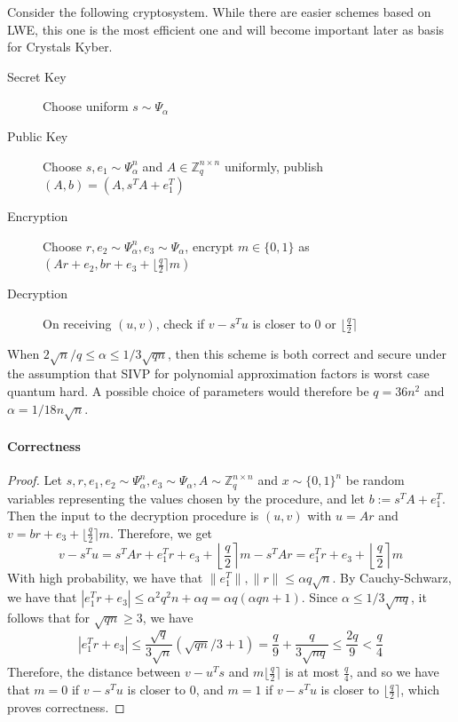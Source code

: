 \documentclass{report}
\newcommand{\Z}{\mathbb{Z}}
\begin{document}


\remark[A cryptosystem]
\label{lwe_cryptosystem}
Consider the following cryptosystem. While there are easier schemes based on LWE, this one is the most efficient one and will become important later as basis for Crystals Kyber.
\begin{description}
\item[Secret Key] Choose uniform $s \sim \Psi_\alpha$
\item[Public Key] Choose $s, e_1 \sim \Psi_\alpha^n$ and $A \in \Z_q^{n \times n}$ uniformly, publish $(A, b) = (A, s^TA + e_1^T)$
\item[Encryption] Choose $r, e_2 \sim \Psi_\alpha^n, e_3 \sim \Psi_\alpha$, encrypt $m \in \{ 0, 1 \}$ as $(Ar + e_2, br + e_3 + \lfloor \frac q 2 \rceil m)$
\item[Decryption] On receiving $(u, v)$, check if $v - s^Tu$ is closer to $0$ or $\lfloor \frac q 2 \rceil$
\end{description}
When $2\sqrt{n}/q \leq \alpha \leq 1/3\sqrt{qn}$, then this scheme is both correct and secure under the assumption that SIVP for polynomial approximation factors is worst case quantum hard. A possible choice of parameters would therefore be $q = 36n^2$ and $\alpha = 1/18n\sqrt{n}$.

\paragraph{Correctness}
\begin{proof}
Let $s, r, e_1, e_2 \sim \Psi_\alpha^n, e_3 \sim \Psi_\alpha, A \sim \Z_q^{n \times n}$ and $x \sim \{ 0, 1 \}^n$ be random variables representing the values chosen by the procedure, and let $b := s^TA + e_1^T$. Then the input to the decryption procedure is $(u, v)$ with $u = Ar$ and $v = br + e_3 + \lfloor \frac q 2 \rceil m$. Therefore, we get
\begin{equation}
v - s^Tu = s^TAr + e_1^Tr + e_3 + \left\lfloor \frac q 2 \right\rceil m - s^TAr =  e_1^Tr + e_3 + \left\lfloor \frac q 2 \right\rceil m\nonumber
\end{equation}
With high probability, we have that $\| e_1^T \|, \| r \| \leq \alpha q \sqrt{n}$. By Cauchy-Schwarz, we have that $| e_1^Tr + e_3 | \leq \alpha^2 q^2 n + \alpha q = \alpha q (\alpha q n + 1)$. Since $\alpha \leq 1/3\sqrt{nq}$, it follows that for $\sqrt{qn} \geq 3$, we have
\begin{equation}
| e_1^Tr + e_3 | \leq \frac {\sqrt{q}} {3\sqrt{n}} ( \sqrt{qn}/3 + 1 ) = \frac q 9 + \frac {q} {3\sqrt{nq}} \leq \frac {2q} 9 < \frac q 4 \nonumber
\end{equation}
Therefore, the distance between $v - u^Ts$ and $m\lfloor \frac q 2 \rceil$ is at most $\frac q 4$, and so we have that $m = 0$ if $v - s^Tu$ is closer to $0$, and $m = 1$ if $v - s^Tu$ is closer to $\lfloor \frac q 2 \rceil$, which proves correctness. \qedhere
\end{proof}
\end{document}
